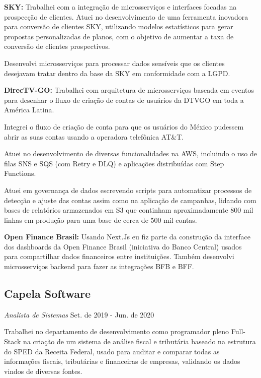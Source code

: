 \documentclass[a4paper,10pt]{article}
\begin{document}

\vspace{2mm} \textcolor{corSubSection}{\bfseries{SKY:}}
Trabalhei com a integração de microsserviços e interfaces
focadas na prospecção de clientes.
Atuei no desenvolvimento de uma ferramenta inovadora para conversão de clientes SKY,
utilizando modelos estatísticos para gerar propostas personalizadas de planos,
com o objetivo de aumentar a taxa de conversão de clientes prospectivos.

Desenvolvi microsserviços para processar dados sensíveis que os clientes
desejavam tratar dentro da base da SKY em conformidade com a LGPD.

\vspace{2mm} \textcolor{corSubSection}{\bfseries{DirecTV-GO:}}
Trabalhei com arquitetura de microsserviços baseada em eventos
para desenhar o fluxo de criação de contas de usuários
da DTVGO em toda a América Latina.

Integrei o fluxo de criação de conta para que os usuários do México
pudessem abrir as suas contas usando a operadora telefônica AT\&T.

Atuei no desenvolvimento de diversas funcionalidades na AWS,
incluindo o uso de filas SNS e SQS (com Retry e DLQ)
e aplicações distribuídas com Step Functions.

Atuei em governança de dados escrevendo scripts
para automatizar processos de detecção e ajuste das contas
assim como na aplicação de campanhas,
lidando com bases de relatórios armazenados em S3 que continham aproximadamente
800 mil linhas em produção para uma base de cerca de 500 mil contas.


\vspace{2mm} \textcolor{corSubSection}{\bfseries{Open Finance Brasil:}}
Usando Next.Js eu fiz parte da construção da interface dos dashboards
da Open Finance Brasil (iniciativa do Banco Central)
usados para compartilhar dados financeiros entre instituições.
Também desenvolvi microsserviços backend para fazer as integrações BFB e BFF.

\subsection*{Capela Software}
\textcolor{corSubSection}{\emph{Analista de Sistemas}}
\hfill\textcolor{corSubSection}{Set. de 2019 - Jun. de 2020}

Trabalhei no departamento de desenvolvimento como programador pleno Full-Stack
na criação de um sistema de análise fiscal e tributária
baseado na estrutura do SPED da Receita Federal,
usado para auditar e comparar todas as informações fiscais,
tributárias e financeiras de empresas,
validando os dados vindos de diversas fontes.
\end{document}

